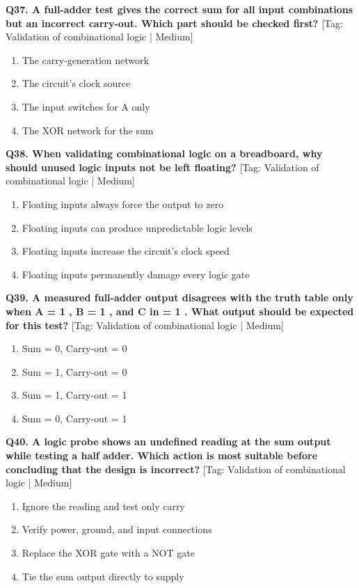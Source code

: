 \noindent\textbf{Q37. A full-adder test gives the correct sum for all input combinations but an incorrect carry-out. Which part should be checked first?} \hfill [Tag: Validation of combinational logic | Medium]
\begin{enumerate}[label=(\alph*),topsep=2pt,itemsep=1pt,partopsep=0pt,parsep=0pt]
    \item {The carry-generation network}
    \item {The circuit's clock source}
    \item {The input switches for A only}
    \item {The XOR network for the sum}
\end{enumerate}
\vspace{2mm}

\noindent\textbf{Q38. When validating combinational logic on a breadboard, why should unused logic inputs not be left floating?} \hfill [Tag: Validation of combinational logic | Medium]
\begin{enumerate}[label=(\alph*),topsep=2pt,itemsep=1pt,partopsep=0pt,parsep=0pt]
    \item {Floating inputs always force the output to zero}
    \item {Floating inputs can produce unpredictable logic levels}
    \item {Floating inputs increase the circuit's clock speed}
    \item {Floating inputs permanently damage every logic gate}
\end{enumerate}
\vspace{2mm}

\noindent\textbf{Q39. A measured full-adder output disagrees with the truth table only when A = 1 , B = 1 , and C in = 1 . What output should be expected for this test?} \hfill [Tag: Validation of combinational logic | Medium]
\begin{enumerate}[label=(\alph*),topsep=2pt,itemsep=1pt,partopsep=0pt,parsep=0pt]
    \item {Sum = 0, Carry-out = 0}
    \item {Sum = 1, Carry-out = 0}
    \item {Sum = 1, Carry-out = 1}
    \item {Sum = 0, Carry-out = 1}
\end{enumerate}
\vspace{2mm}

\noindent\textbf{Q40. A logic probe shows an undefined reading at the sum output while testing a half adder. Which action is most suitable before concluding that the design is incorrect?} \hfill [Tag: Validation of combinational logic | Medium]
\begin{enumerate}[label=(\alph*),topsep=2pt,itemsep=1pt,partopsep=0pt,parsep=0pt]
    \item {Ignore the reading and test only carry}
    \item {Verify power, ground, and input connections}
    \item {Replace the XOR gate with a NOT gate}
    \item {Tie the sum output directly to supply}
\end{enumerate}
\vspace{2mm}

